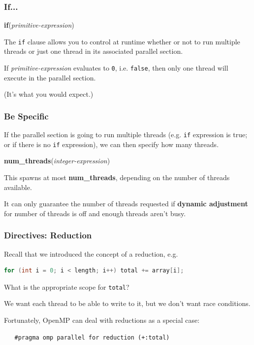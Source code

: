 \begin{frame}
\frametitle{If...}

  \begin{center}
    {\bf if}({\it primitive-expression})    
  \end{center}
The {\tt if} clause allows you to control at runtime whether or not to run
multiple threads or just one thread in its associated parallel section.


If {\it primitive-expression} evaluates to {\tt 0}, i.e. {\tt false}, then
only one thread will execute in the parallel section. 

(It's what you would expect.)


\end{frame}


\begin{frame}
\frametitle{Be Specific}

If the parallel section is going to run multiple threads (e.g. {\tt if} expression
is true; or if there is no {\tt if} expression), we can then specify how many threads.

  \begin{center}
    {\bf num\_threads}({\it integer-expression})    
  \end{center}

This spawns at most {\bf num\_threads}, depending on the number of
threads available.  

It can only guarantee the number of threads
requested if {\bf dynamic adjustment} for number of threads is off and
enough threads aren't busy.


\end{frame}


\begin{frame}[fragile]
\frametitle{Directives: Reduction}

Recall that we introduced the concept of a reduction, e.g.

\begin{lstlisting}[language=C,morekeywords={foreach,pragma,omp,parallel,single,nowait,task,untied,barrier,taskyield}]
  for (int i = 0; i < length; i++) total += array[i];
\end{lstlisting}

What is the appropriate scope for {\tt total}? 

We want each thread
to be able to write to it, but we don't want race conditions.


Fortunately, OpenMP can deal with reductions as a special case:

\verb!   #pragma omp parallel for reduction (+:total)!

\end{frame}


